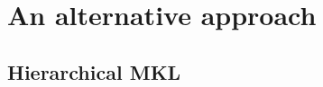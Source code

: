 \chapter{An alternative approach}
\label{AppendixA}


\section{Hierarchical MKL}
\label{subsec:hierarchy}



